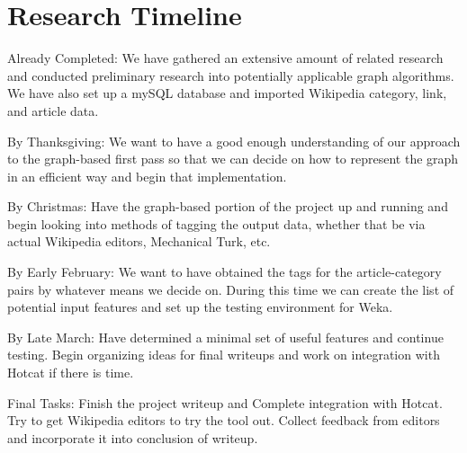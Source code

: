\documentclass{sig-alternate}
\begin{document}
\section{Research Timeline}
\label{sec:research_timeline}
\begin{itemize*}
	\item {\sc Already Completed}: We have gathered an extensive amount of related research and conducted preliminary research into potentially applicable graph algorithms. We have also set up a mySQL database and imported Wikipedia category, link, and article data.\vspace{3pt}
	\item {\sc By Thanksgiving}: We want to have a good enough understanding of our approach to the graph-based first pass so that we can decide on how to represent the graph in an efficient way and begin that implementation.\vspace{3pt}
	\item {\sc By Christmas}: Have the graph-based portion of the project up and running and begin looking into methods of tagging the output data, whether that be via actual Wikipedia editors, Mechanical Turk, etc.\vspace{3pt}
	\item {\sc By Early February}: We want to have obtained the tags for the article-category pairs by whatever means we decide on. During this time we can create the list of potential input features and set up the testing environment for Weka.\vspace{3pt}
	\item {\sc By Late March}: Have determined a minimal set of useful features and continue testing. Begin organizing ideas for final writeups and work on integration with Hotcat if there is time.\vspace{3pt}
	\item {\sc Final Tasks}: Finish the project writeup and Complete integration with Hotcat. Try to get Wikipedia editors to try the tool out. Collect feedback from editors and incorporate it into conclusion of writeup.
\end{itemize*}
\newpage

\nocite{*}
\end{document}
